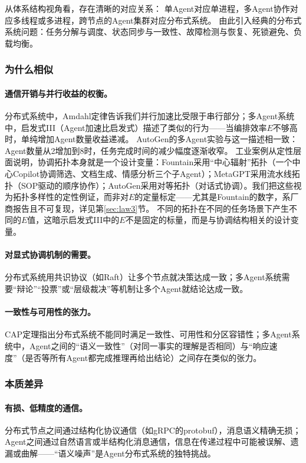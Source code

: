 从体系结构视角看，存在清晰的对应关系：
单Agent对应单进程，多Agent协作对应多线程或多进程，跨节点的Agent集群对应分布式系统。
由此引入经典的分布式系统问题：任务分解与调度、状态同步与一致性、故障检测与恢复、死锁避免、负载均衡。

\subsubsection{为什么相似}

\paragraph{通信开销与并行收益的权衡。}
分布式系统中，Amdahl定律告诉我们并行加速比受限于串行部分；多Agent系统中，启发式III（Agent加速比启发式）描述了类似的行为——当编排效率$E$不够高时，单纯增加Agent数量收益递减。
AutoGen的多Agent实验与这一描述相一致：Agent数量从2增加到8时，任务完成时间的减少幅度逐渐收窄\cite{wu2023autogen}。
工业案例从定性层面说明，协调拓扑本身就是一个设计变量：Fountain采用``中心辐射''拓扑（一个中心Copilot协调筛选、文档生成、情感分析三个子Agent）\cite{anthropic2026agenticreport}；MetaGPT采用流水线拓扑（SOP驱动的顺序协作）；AutoGen采用对等拓扑（对话式协调）。我们把这些视为拓扑多样性的定性例证，而非对$E$的定量标定——尤其是Fountain的数字，系厂商报告且不可复现，详见第\ref{sec:law3}节。
不同的拓扑在不同的任务场景下产生不同的$E$值，这暗示启发式III中的$E$不是固定的标量，而是与协调结构相关的设计变量。

\paragraph{对显式协调机制的需要。}
分布式系统用共识协议（如Raft\cite{raft2014}）让多个节点就决策达成一致；多Agent系统需要``辩论''``投票''或``层级裁决''等机制让多个Agent就结论达成一致。

\paragraph{一致性与可用性的张力。}
CAP定理指出分布式系统不能同时满足一致性、可用性和分区容错性\cite{cap2002}；多Agent系统中，Agent之间的``语义一致性''（对同一事实的理解是否相同）与``响应速度''（是否等所有Agent都完成推理再给出结论）之间存在类似的张力。

\subsubsection{本质差异}

\paragraph{有损、低精度的通信。}
分布式节点之间通过结构化协议通信（如gRPC的protobuf），消息语义精确无损；Agent之间通过自然语言或半结构化消息通信，信息在传递过程中可能被误解、遗漏或曲解——``语义噪声''是Agent分布式系统的独特挑战。

